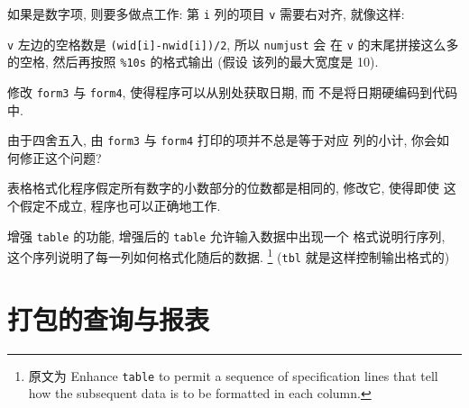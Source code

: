 如果是数字项, 则要多做点工作: 第 \verb'i' 列的项目 \verb'v' 需要右对齐,
就像这样:
\begin{center}
\end{center}
\verb'v' 左边的空格数是 \verb'(wid[i]-nwid[i])/2', 所以 \verb'numjust' 会
在 \verb'v' 的末尾拼接这么多的空格, 然后再按照 \verb'%10s' 的格式输出 (假设 
该列的最大宽度是 10).

\begin{exercise}
    修改 \verb'form3' 与 \verb'form4', 使得程序可以从别处获取日期, 而
    不是将日期硬编码到代码中.
\end{exercise}

\begin{exercise}
    由于四舍五入, 由 \verb'form3' 与 \verb'form4' 打印的项并不总是等于对应
    列的小计, 你会如何修正这个问题?
\end{exercise}

\begin{exercise}
    表格格式化程序假定所有数字的小数部分的位数都是相同的, 修改它, 使得即使 
    这个假定不成立, 程序也可以正确地工作.
\end{exercise}

\begin{exercise}
    增强 \verb'table' 的功能, 增强后的 \verb'table' 允许输入数据中出现一个
    格式说明行序列, 这个序列说明了每一列如何格式化随后的数据.
    \footnote{原文为 
        Enhance \texttt{table} to permit a sequence of specification lines
        that tell how the subsequent data is to be formatted in each column.
    } (\texttt{tbl} 就是这样控制输出格式的)
\end{exercise}

\section{打包的查询与报表}
\label{sec:packaged_queries_and_reports}

